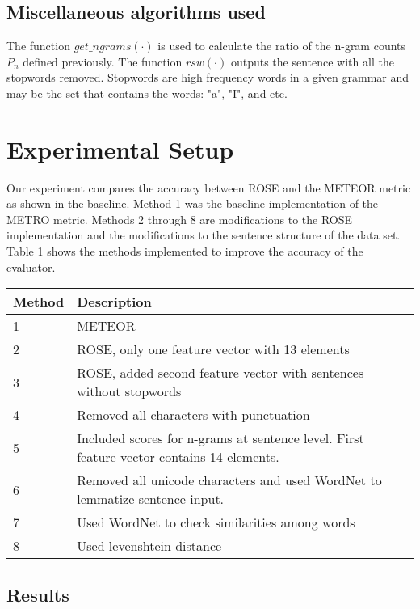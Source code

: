 \documentclass[11pt,letterpaper]{article}
\begin{document}
\subsection{Miscellaneous algorithms used}

The function $get\_ngrams(\cdot)$ is used to calculate the ratio of the n-gram counts $P_{n}$ defined previously. The function $rsw(\cdot)$ outputs the sentence with all the stopwords removed. Stopwords are high frequency words in a given grammar and may be the set that contains the words: "a", "I", and etc.


\section{Experimental Setup}

Our experiment compares the accuracy between ROSE and the METEOR metric as shown in the baseline. Method 1 was the baseline implementation of the METRO metric. Methods 2 through 8 are modifications to the ROSE implementation  \cite{song2011regression} and the modifications to the sentence structure of the data set. 
Table 1 shows the methods implemented to improve the accuracy of the evaluator.
\begin{center}
	\begin{tabular}{| l | p{7cm} |}
	\hline
	Method & Description \\ \hline
	1 & METEOR \\ \hline
	2 & ROSE, only one feature vector with 13 elements \\ \hline
	3 & ROSE, added second feature vector with sentences without stopwords \\ \hline
	4 & Removed all characters with punctuation \\ \hline
	5 & Included scores for n-grams at sentence level. First feature vector contains 14 elements.  \\ \hline
	6 & Removed all unicode characters and used WordNet to lemmatize sentence input. \\ \hline
	7 & Used WordNet to check similarities among words \\ \hline
	8 & Used levenshtein distance \\ \hline
	\end{tabular}
\end{center}
	

\subsection{Results}
\end{document}
